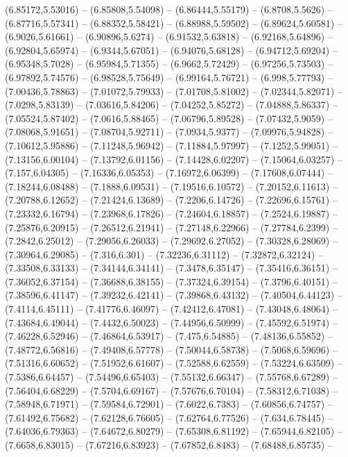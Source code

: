 {(6.85172,5.53016) -- (6.85808,5.54098) -- (6.86444,5.55179) -- (6.8708,5.5626) -- (6.87716,5.57341) -- (6.88352,5.58421) -- (6.88988,5.59502) -- (6.89624,5.60581) -- (6.9026,5.61661) -- (6.90896,5.6274) -- (6.91532,5.63818) -- (6.92168,5.64896) --
(6.92804,5.65974) -- (6.9344,5.67051) -- (6.94076,5.68128) -- (6.94712,5.69204) -- (6.95348,5.7028) -- (6.95984,5.71355) -- (6.9662,5.72429) -- (6.97256,5.73503) -- (6.97892,5.74576) -- (6.98528,5.75649) -- (6.99164,5.76721) -- (6.998,5.77793) --
(7.00436,5.78863) -- (7.01072,5.79933) -- (7.01708,5.81002) -- (7.02344,5.82071) -- (7.0298,5.83139) -- (7.03616,5.84206) -- (7.04252,5.85272) -- (7.04888,5.86337) -- (7.05524,5.87402) -- (7.0616,5.88465) -- (7.06796,5.89528) -- (7.07432,5.9059) --
(7.08068,5.91651) -- (7.08704,5.92711) -- (7.0934,5.9377) -- (7.09976,5.94828) -- (7.10612,5.95886) -- (7.11248,5.96942) -- (7.11884,5.97997) -- (7.1252,5.99051) -- (7.13156,6.00104) -- (7.13792,6.01156) -- (7.14428,6.02207) -- (7.15064,6.03257) --
(7.157,6.04305) -- (7.16336,6.05353) -- (7.16972,6.06399) -- (7.17608,6.07444) -- (7.18244,6.08488) -- (7.1888,6.09531) -- (7.19516,6.10572) -- (7.20152,6.11613) -- (7.20788,6.12652) -- (7.21424,6.13689) -- (7.2206,6.14726) -- (7.22696,6.15761) --
(7.23332,6.16794) -- (7.23968,6.17826) -- (7.24604,6.18857) -- (7.2524,6.19887) -- (7.25876,6.20915) -- (7.26512,6.21941) -- (7.27148,6.22966) -- (7.27784,6.2399) -- (7.2842,6.25012) -- (7.29056,6.26033) -- (7.29692,6.27052) -- (7.30328,6.28069) --
(7.30964,6.29085) -- (7.316,6.301) -- (7.32236,6.31112) -- (7.32872,6.32124) -- (7.33508,6.33133) -- (7.34144,6.34141) -- (7.3478,6.35147) -- (7.35416,6.36151) -- (7.36052,6.37154) -- (7.36688,6.38155) -- (7.37324,6.39154) -- (7.3796,6.40151) --
(7.38596,6.41147) -- (7.39232,6.42141) -- (7.39868,6.43132) -- (7.40504,6.44123) -- (7.4114,6.45111) -- (7.41776,6.46097) -- (7.42412,6.47081) -- (7.43048,6.48064) -- (7.43684,6.49044) -- (7.4432,6.50023) -- (7.44956,6.50999) -- (7.45592,6.51974) --
(7.46228,6.52946) -- (7.46864,6.53917) -- (7.475,6.54885) -- (7.48136,6.55852) -- (7.48772,6.56816) -- (7.49408,6.57778) -- (7.50044,6.58738) -- (7.5068,6.59696) -- (7.51316,6.60652) -- (7.51952,6.61607) -- (7.52588,6.62559) -- (7.53224,6.63509) --
(7.5386,6.64457) -- (7.54496,6.65403) -- (7.55132,6.66347) -- (7.55768,6.67289) -- (7.56404,6.68229) -- (7.5704,6.69167) -- (7.57676,6.70104) -- (7.58312,6.71038) -- (7.58948,6.71971) -- (7.59584,6.72901) -- (7.6022,6.7383) -- (7.60856,6.74757) --
(7.61492,6.75682) -- (7.62128,6.76605) -- (7.62764,6.77526) -- (7.634,6.78445) -- (7.64036,6.79363) -- (7.64672,6.80279) -- (7.65308,6.81192) -- (7.65944,6.82105) -- (7.6658,6.83015) -- (7.67216,6.83923) -- (7.67852,6.8483) -- (7.68488,6.85735) --
}
